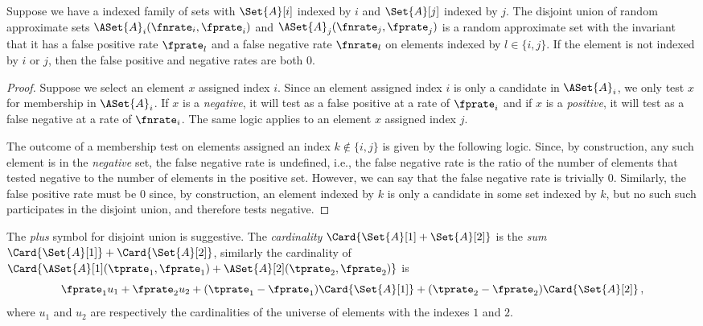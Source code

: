 \documentclass[ ../main.tex]{subfiles}
\begin{document}
\begin{theorem}
	Suppose we have a indexed family of sets with $\Set{A}[i]$ indexed by $i$ and $\Set{A}[j]$ indexed by $j$.
	The disjoint union of random approximate sets $\ASet{A}_i(\fnrate_i,\fprate_i)$ and $\ASet{A}_j(\fnrate_j,\fprate_j)$ is a random approximate set with the invariant that it has a false positive rate $\fprate_l$ and a false negative rate $\fnrate_l$ on elements indexed by $l \in \{i,j\}$.
	If the element is not indexed by $i$ or $j$, then the false positive and negative rates are both $0$.
\end{theorem}
\begin{proof}
	Suppose we select an element $x$ assigned index $i$.
	Since an element assigned index $i$ is only a candidate in $\ASet{A}_i$, we only test $x$ for membership in $\ASet{A}_i$.
	If $x$ is a \emph{negative}, it will test as a false positive at a rate of $\fprate_i$ and if $x$ is a \emph{positive}, it will test as a false negative at a rate of $\fnrate_i$.
	The same logic applies to an element $x$ assigned index $j$.
	
	The outcome of a membership test on elements assigned an index $k \notin \{i,j\}$ is given by the following logic.
	Since, by construction, any such element is in the \emph{negative} set, the false negative rate is undefined, i.e., the false negative rate is the ratio of the number of elements that tested negative to the number of elements in the positive set.
	However, we can say that the false negative rate is trivially $0$.
	Similarly, the false positive rate must be $0$ since, by construction, an element indexed by $k$ is only a candidate in some set indexed by $k$, but no such such participates in the disjoint union, and therefore tests negative.
\end{proof}
The \emph{plus} symbol for disjoint union is suggestive. The \emph{cardinality} $\Card{\Set{A}[1]+\Set{A}[2]}$ is the \emph{sum} $\Card{\Set{A}[1]} + \Card{\Set{A}[2]}$, similarly the cardinality of $\Card{\ASet{A}[1](\tprate_1,\fprate_1) + \ASet{A}[2](\tprate_2,\fprate_2)}$ is
\begin{equation}
\fprate_1 u_1 + \fprate_2 u_2 + (\tprate_1 - \fprate_1) \Card{\Set{A}[1]} + (\tprate_2 - \fprate_2) \Card{\Set{A}[2]}\,,
\end{equation}
where $u_1$ and $u_2$ are respectively the cardinalities of the universe of elements with the indexes $1$ and $2$.
\end{document}
